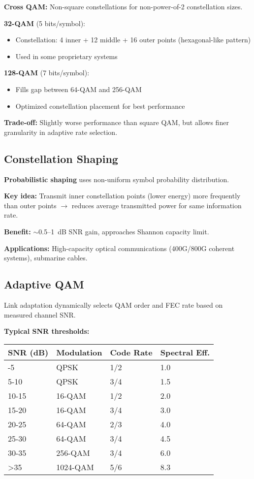 \textbf{Cross QAM:} Non-square constellations for non-power-of-2 constellation sizes.

\textbf{32-QAM} (5 bits/symbol):
\begin{itemize}
\item Constellation: 4 inner + 12 middle + 16 outer points (hexagonal-like pattern)
\item Used in some proprietary systems
\end{itemize}

\textbf{128-QAM} (7 bits/symbol):
\begin{itemize}
\item Fills gap between 64-QAM and 256-QAM
\item Optimized constellation placement for best performance
\end{itemize}

\textbf{Trade-off:} Slightly worse performance than square QAM, but allows finer granularity in adaptive rate selection.

\subsection{Constellation Shaping}

\textbf{Probabilistic shaping} uses non-uniform symbol probability distribution.

\textbf{Key idea:} Transmit inner constellation points (lower energy) more frequently than outer points $\rightarrow$ reduces average transmitted power for same information rate.

\textbf{Benefit:} $\sim$0.5--1~dB SNR gain, approaches Shannon capacity limit.

\textbf{Applications:} High-capacity optical communications (400G/800G coherent systems), submarine cables.

\subsection{Adaptive QAM}

Link adaptation dynamically selects QAM order and FEC rate based on measured channel SNR.

\textbf{Typical SNR thresholds:}

{\def\LTcaptype{} %
\begin{longtable}[]{@{}llll@{}}
\toprule\noalign{}
SNR (dB) & Modulation & Code Rate & Spectral Eff. \\
\midrule\noalign{}
\endhead
\bottomrule\noalign{}
\endlastfoot
0-5 & QPSK & 1/2 & 1.0 \\
5-10 & QPSK & 3/4 & 1.5 \\
10-15 & 16-QAM & 1/2 & 2.0 \\
15-20 & 16-QAM & 3/4 & 3.0 \\
20-25 & 64-QAM & 2/3 & 4.0 \\
25-30 & 64-QAM & 3/4 & 4.5 \\
30-35 & 256-QAM & 3/4 & 6.0 \\
\textgreater35 & 1024-QAM & 5/6 & 8.3 \\
\end{longtable}
}

